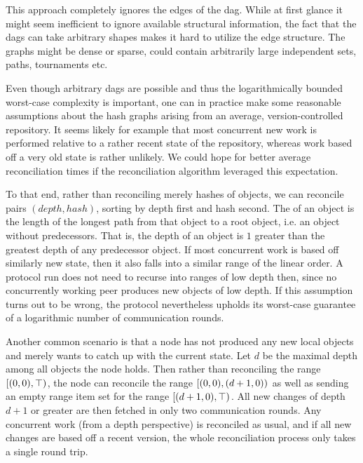This approach completely ignores the edges of the dag. While at first glance it might seem inefficient to ignore available structural information, the fact that the dags can take arbitrary shapes makes it hard to utilize the edge structure. The graphs might be dense or sparse, could contain arbitrarily large independent sets, paths, tournaments etc.

Even though arbitrary dags are possible and thus the logarithmically bounded worst-case complexity is important, one can in practice make some reasonable assumptions about the hash graphs arising from an average, version-controlled repository. It seems likely for example that most concurrent new work is performed relative to a rather recent state of the repository, whereas work based off a very old state is rather unlikely. We could hope for better average reconciliation times if the reconciliation algorithm leveraged this expectation.

To that end, rather than reconciling merely hashes of objects, we can reconcile pairs $(\mathit{depth}, \mathit{hash})$, sorting by depth first and hash second. The  of an object is the length of the longest path from that object to a root object, i.e. an object without predecessors. That is, the depth of an object is $1$ greater than the greatest depth of any predecessor object. If most concurrent work is based off similarly new state, then it also falls into a similar range of the linear order. A protocol run does not need to recurse into ranges of low depth then, since no concurrently working peer produces new objects of low depth. If this assumption turns out to be wrong, the protocol nevertheless upholds its worst-case guarantee of a logarithmic number of communication rounds.

Another common scenario is that a node has not produced any new local objects and merely wants to catch up with the current state. Let $d$ be the maximal depth among all objects the node holds. Then rather than reconciling the range $[{(0, 0)},{\top})_{}$, the node can reconcile the range $[{(0, 0)},{(d + 1, 0)})_{}$ as well as sending an empty range item set for the range $[{(d + 1, 0)},{\top})_{}$. All new changes of depth $d + 1$ or greater are then fetched in only two communication rounds. Any concurrent work (from a depth perspective) is reconciled as usual, and if all new changes are based off a recent version, the whole reconciliation process only takes a single round trip.